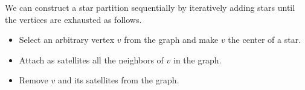 
\begin{gram}
\label{graphcon::star::partition::seq}

We can construct a star partition sequentially by iteratively adding
stars until the vertices are exhausted as follows.

\begin{itemize}

\item Select an arbitrary vertex $v$ from the graph and make $v$ the
  center of a star.

\item Attach as satellites all the neighbors of $v$ in the graph.

\item Remove $v$ and its satellites from the graph.

\end{itemize}
%
\end{gram}

